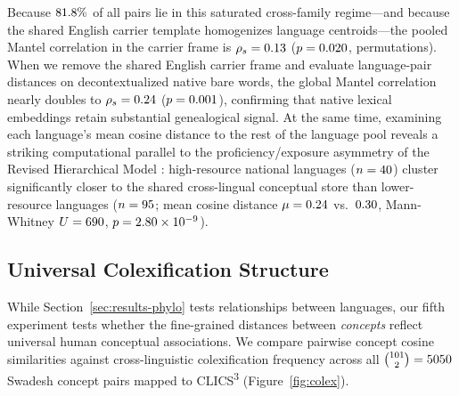 Because $81.8{}\%$ of all pairs lie in this saturated cross-family regime—and because the shared English carrier template homogenizes language centroids—the pooled Mantel correlation in the carrier frame is $\rho_s = 0.13{}$ ($p = 0.020{}$, \MantelPermutations{} permutations).
When we remove the shared English carrier frame and evaluate language-pair distances on decontextualized native bare words, the global Mantel correlation nearly doubles to $\rho_s = 0.24{}$ ($p = 0.001{}$), confirming that native lexical embeddings retain substantial genealogical signal.
At the same time, examining each language's mean cosine distance to the rest of the language pool reveals a striking computational parallel to the proficiency/exposure asymmetry of the Revised Hierarchical Model \citep{kroll1994,kroll2010}: high-resource national languages ($n = 40{}$) cluster significantly closer to the shared cross-lingual conceptual store than lower-resource languages ($n = 95{}$; mean cosine distance $\mu = 0.24{}$ vs.\ $0.30{}$, Mann-Whitney $U = 690{}$, $p = 2.80 \times 10^{-9}{}$).

\subsection{Universal Colexification Structure}
\label{sec:results-colex}

While Section~\ref{sec:results-phylo} tests relationships between languages, our fifth experiment tests whether the fine-grained distances between \emph{concepts} reflect universal human conceptual associations.
We compare pairwise concept cosine similarities against cross-linguistic colexification frequency across all $\binom{101}{2} = 5050{}$ Swadesh concept pairs mapped to CLICS\textsuperscript{3} \citep{list2018,rzymski2020} (Figure~\ref{fig:colex}).

